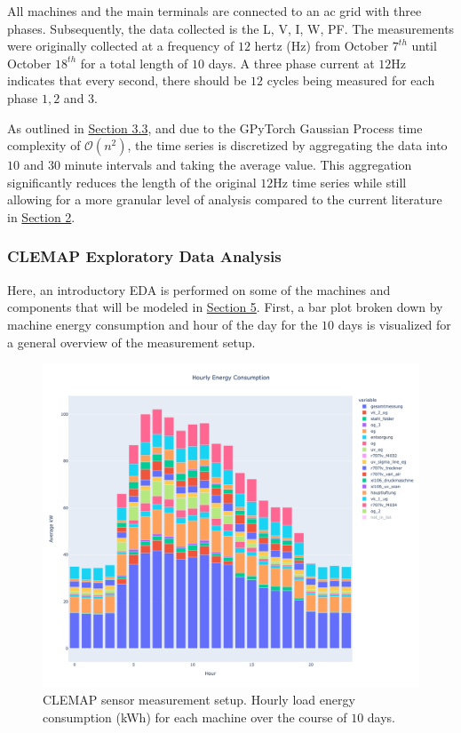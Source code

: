 All machines and the main terminals are connected to an \ac{ac} grid with three phases. Subsequently, the data collected is the \ac{L}, V, I, W, \ac{PF}. The measurements were originally collected at a frequency of $12$ hertz (Hz) from October $7^{th}$ until October $18^{th}$ for a total length of $10$ days. A three phase current at $12$Hz indicates that every second, there should be $12$ cycles being measured for each phase $1, 2$ and $3$. 

As outlined in \hyperlink{subsection.3.3}{Section 3.3}, and due to the GPyTorch Gaussian Process time complexity of $\mathcal{O}(n^2)$, the time series is discretized by aggregating the data into $10$ and $30$ minute intervals and taking the average value. This aggregation significantly reduces the length of the original $12$Hz time series while still allowing for a more granular level of analysis compared to the current literature in \hyperlink{section.2}{Section 2}.

\subsubsection{CLEMAP Exploratory Data Analysis}

Here, an introductory EDA is performed on some of the machines and components that will be modeled in \hyperlink{section.5}{Section 5}. First, a bar plot broken down by machine energy consumption and hour of the day for the $10$ days is visualized for a general overview of the measurement setup.

\begin{figure}[htp]
\centering
\graphicspath{ {./images/} }
\includegraphics[scale=0.41]{images/hourly_load_barplot.png}
\caption{CLEMAP sensor measurement setup. Hourly load energy consumption (kWh) for each machine over the course of $10$ days.}
\label{fig:fig6}
\end{figure}

